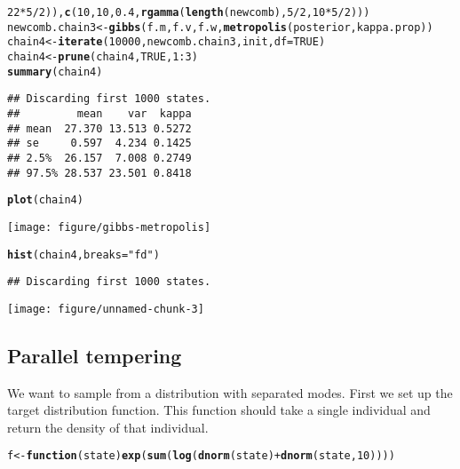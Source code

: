 \documentclass{article}\usepackage[]{graphicx}\usepackage[]{color}
\makeatletter
\def\maxwidth{ %
  \ifdim\Gin@nat@width>\linewidth
    \linewidth
  \else
    \Gin@nat@width
  \fi
}
\newcommand{\hlnum}[1]{\textcolor[rgb]{0.686,0.059,0.569}{#1}}%
\newcommand{\hlstr}[1]{\textcolor[rgb]{0.192,0.494,0.8}{#1}}%
\newcommand{\hlopt}[1]{\textcolor[rgb]{0,0,0}{#1}}%
\newcommand{\hlstd}[1]{\textcolor[rgb]{0.345,0.345,0.345}{#1}}%
\newcommand{\hlkwa}[1]{\textcolor[rgb]{0.161,0.373,0.58}{\textbf{#1}}}%
\newcommand{\hlkwb}[1]{\textcolor[rgb]{0.69,0.353,0.396}{#1}}%
\newcommand{\hlkwc}[1]{\textcolor[rgb]{0.333,0.667,0.333}{#1}}%
\newcommand{\hlkwd}[1]{\textcolor[rgb]{0.737,0.353,0.396}{\textbf{#1}}}%
\newenvironment{kframe}{%
 \def\at@end@of@kframe{}%
 \ifinner\ifhmode%
  \def\at@end@of@kframe{\end{minipage}}%
  \begin{minipage}{\columnwidth}%
 \fi\fi%
 \def\FrameCommand##1{\hskip\@totalleftmargin \hskip-\fboxsep
 \colorbox{shadecolor}{##1}\hskip-\fboxsep
     \hskip-\linewidth \hskip-\@totalleftmargin \hskip\columnwidth}%
 \MakeFramed {\advance\hsize-\width
   \@totalleftmargin\z@ \linewidth\hsize
   \@setminipage}}%
 {\par\unskip\endMakeFramed%
 \at@end@of@kframe}
\newenvironment{knitrout}{}{} %
\makeatother
\begin{document}
\begin{knitrout}
\begin{kframe}
\begin{alltt}
    \hlnum{22} \hlopt{*} \hlnum{5}\hlopt{/}\hlnum{2}\hlstd{)),} \hlkwd{c}\hlstd{(}\hlnum{10}\hlstd{,} \hlnum{10}\hlstd{,} \hlnum{0.4}\hlstd{,} \hlkwd{rgamma}\hlstd{(}\hlkwd{length}\hlstd{(newcomb),} \hlnum{5}\hlopt{/}\hlnum{2}\hlstd{,} \hlnum{10} \hlopt{*} \hlnum{5}\hlopt{/}\hlnum{2}\hlstd{)))}
\hlstd{newcomb.chain3} \hlkwb{<-} \hlkwd{gibbs}\hlstd{(f.m, f.v, f.w,} \hlkwd{metropolis}\hlstd{(posterior, kappa.prop))}
\hlstd{chain4} \hlkwb{<-} \hlkwd{iterate}\hlstd{(}\hlnum{10000}\hlstd{, newcomb.chain3, init,} \hlkwc{df} \hlstd{=} \hlnum{TRUE}\hlstd{)}
\hlstd{chain4} \hlkwb{<-} \hlkwd{prune}\hlstd{(chain4,} \hlnum{TRUE}\hlstd{,} \hlnum{1}\hlopt{:}\hlnum{3}\hlstd{)}
\hlkwd{summary}\hlstd{(chain4)}
\end{alltt}
\begin{verbatim}
## Discarding first 1000 states.
##         mean    var  kappa
## mean  27.370 13.513 0.5272
## se     0.597  4.234 0.1425
## 2.5%  26.157  7.008 0.2749
## 97.5% 28.537 23.501 0.8418
\end{verbatim}
\begin{alltt}
\hlkwd{plot}\hlstd{(chain4)}
\end{alltt}
\end{kframe}
\texttt{[image: figure/gibbs-metropolis]} 

\end{knitrout}

\begin{knitrout}
\color{fgcolor}\begin{kframe}
\begin{alltt}
\hlkwd{hist}\hlstd{(chain4,} \hlkwc{breaks} \hlstd{=} \hlstr{"fd"}\hlstd{)}
\end{alltt}
\begin{verbatim}
## Discarding first 1000 states.
\end{verbatim}
\end{kframe}
\texttt{[image: figure/unnamed-chunk-3]} 

\end{knitrout}


\subsection{Parallel tempering}
We want to sample from a distribution with separated modes.  First we
set up the target distribution function. This function should take a
single individual and return the density of that individual.
\begin{knitrout}
\color{fgcolor}\begin{kframe}
\begin{alltt}
\hlstd{f} \hlkwb{<-} \hlkwa{function}\hlstd{(}\hlkwc{state}\hlstd{)} \hlkwd{exp}\hlstd{(}\hlkwd{sum}\hlstd{(}\hlkwd{log}\hlstd{(}\hlkwd{dnorm}\hlstd{(state)} \hlopt{+} \hlkwd{dnorm}\hlstd{(state,} \hlnum{10}\hlstd{))))}
\end{alltt}
\end{kframe}
\end{knitrout}
\end{document}
